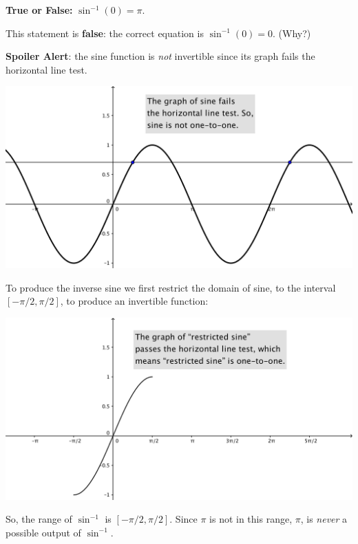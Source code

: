 \documentclass[nooutcomes]{ximera}
\begin{document}
\begin{problem}

  \textbf{True or False:}
  $\sin^{-1}(0) = \pi$.
  \begin{freeResponse}
    This statement is \textbf{false}: the correct equation is $\sin^{-1}(0) = 0$. (Why?)

    \textbf{Spoiler Alert}: the sine function is \emph{not} invertible since its graph fails the horizontal line test.
    \begin{image}
      \includegraphics[scale = 0.4]{figure3.png}
    \end{image}
    To produce the inverse sine we first restrict the domain of sine, to the interval $[-\pi/2, \pi/2]$, to produce an invertible function:
    \begin{image}
      \includegraphics[scale = 0.4]{figure4.png}
    \end{image}
    So, the range of $\sin^{-1}$ is $[-\pi/2, \pi/2]$.
    Since $\pi$ is not in this range, $\pi$, is \emph{never} a possible output of $\sin^{-1}$.
  \end{freeResponse}
\end{problem}
\end{document}
